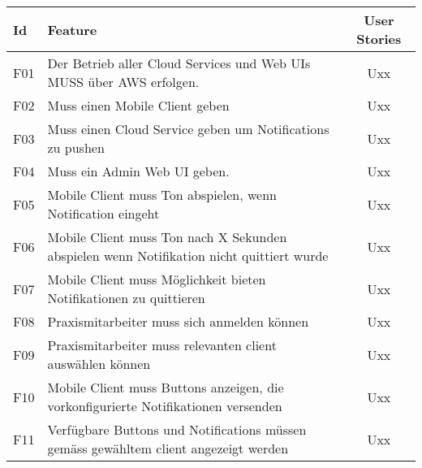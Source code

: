 \begin{table}[h]

    \centering
    \begin{tabular}{|l|p{13cm}|c|}
        \hline
        \textbf{Id} & \textbf{Feature}                                                                                                      & \textbf{User Stories} \\
        \hline
        F01         & Der Betrieb aller Cloud Services und Web UIs MUSS über AWS erfolgen.                                                  & Uxx                 \\
        \hline
        F02        & Muss einen Mobile Client geben                                                                                        & Uxx                 \\
        \hline
        F03        & Muss einen Cloud Service geben um Notifications zu pushen                                                             & Uxx                 \\
        \hline
        F04        & Muss ein Admin Web UI geben.                                                                                          & Uxx                 \\
        \hline
        F05        & Mobile Client muss Ton abspielen, wenn Notification eingeht                                                           & Uxx                 \\
        \hline
        F06        & Mobile Client muss Ton nach X Sekunden abspielen wenn Notifikation nicht quittiert wurde & Uxx \\
        \hline
        F07        & Mobile Client muss Möglichkeit bieten Notifikationen zu quittieren                                                    & Uxx                 \\
        \hline
        F08        & Praxismitarbeiter muss sich anmelden können                                                                           & Uxx                 \\
        \hline
        F09        & Praxismitarbeiter muss relevanten client auswählen können                                                             & Uxx                 \\
        \hline
        F10        & Mobile Client muss Buttons anzeigen, die vorkonfigurierte Notifikationen versenden & Uxx \\
        \hline
        F11        & Verfügbare Buttons und Notifications müssen gemäss gewähltem client angezeigt werden & Uxx \\

\end{tabular}
\end{table}
